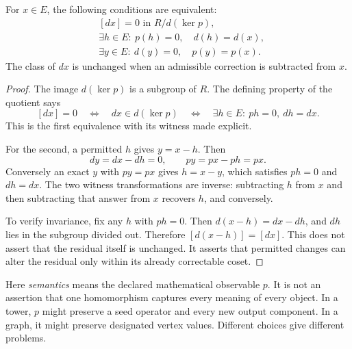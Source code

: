 \begin{KStheorem}\label{KS:KS14}
For \(x\in E\), the following conditions are equivalent:
\[
\begin{aligned}
 &[dx]=0\text{ in }R/d(\ker p),\\
 &\exists h\in E:\ p(h)=0,\quad d(h)=d(x),\\
 &\exists y\in E:\ d(y)=0,\quad p(y)=p(x).
\end{aligned}
\]
The class of \(dx\) is unchanged when an admissible correction is subtracted from \(x\).
\end{KStheorem}
\begin{proof}
The image $d(\ker p)$ is a subgroup of $R$. The defining property of the quotient says
\[
 [dx]=0\quad\Longleftrightarrow\quad
 dx\in d(\ker p)
 \quad\Longleftrightarrow\quad
 \exists h\in E:\ ph=0,\ dh=dx.
\]
This is the first equivalence with its witness made explicit.

For the second, a permitted $h$ gives $y=x-h$. Then
\[
 dy=dx-dh=0,\qquad py=px-ph=px.
\]
Conversely an exact $y$ with $py=px$ gives $h=x-y$, which satisfies $ph=0$ and $dh=dx$. The two witness transformations are inverse: subtracting $h$ from $x$ and then subtracting that answer from $x$ recovers $h$, and conversely.

To verify invariance, fix any $h$ with $ph=0$. Then $d(x-h)=dx-dh$, and $dh$ lies in the subgroup divided out. Therefore $[d(x-h)]=[dx]$. This does not assert that the residual itself is unchanged. It asserts that permitted changes can alter the residual only within its already correctable coset.
\end{proof}
Here \emph{semantics} means the declared mathematical observable \(p\). It is not an assertion that one homomorphism captures every meaning of every object. In a tower, \(p\) might preserve a seed operator and every new output component. In a graph, it might preserve designated vertex values. Different choices give different problems.

